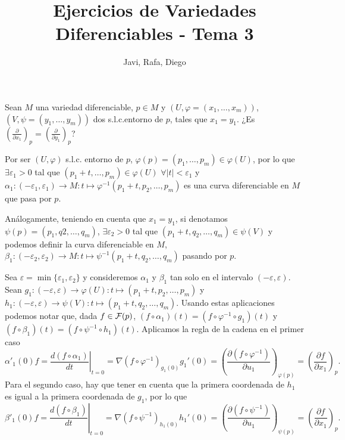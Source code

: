 \documentclass[twoside]{article}
\begin{document}
\title{Ejercicios de Variedades Diferenciables - Tema 3}
\author{Javi, Rafa, Diego}
\maketitle



\begin{ejercicio}{1}\label{1}
Sean $M$ una variedad diferenciable, $p \in M$ y $(U, \varphi = (x_1, \dots , x_m))$, $(V, \psi =
(y_1, \dots , y_m))$ dos s.l.c.entorno de $p$, tales que $x_1 = y_1$. ¿Es $\left(
\frac{\partial}{\partial x_1}\right)_p = \left(\frac{\partial}{\partial y_1}\right)_p$?
\end{ejercicio}
\begin{solucion}
Por ser $(U,\varphi)$ s.l.c. entorno de $p$, $\varphi(p)=(p_1,\dots,p_m)\in\varphi(U)$, por lo que $\exists \varepsilon_1>0$ tal que $(p_1+t,\dots,p_m)\in\varphi(U)$ $\forall |t|<\varepsilon_1$ y $\alpha_1:(-\varepsilon_1,\varepsilon_1)\to M: t\mapsto \varphi^{-1}(p_1+t,p_2,\dots,p_m)$ es una curva diferenciable en $M$ que pasa por $p$. 

Análogamente, teniendo en cuenta que $x_1=y_1$, si denotamos $\psi(p)=(p_1,q2,\dots,q_m)$, $\exists\varepsilon_2>0$ tal que $(p_1+t,q_2,\dots,q_m)\in\psi(V)$ y podemos definir la curva diferenciable en $M$, $\beta_1:(-\varepsilon_2,\varepsilon_2)\to M: t\mapsto\psi^{-1}(p_1+t,q_2,\dots,q_m)$ pasando por $p$. 

Sea $\varepsilon=\min\{\varepsilon_1,\varepsilon_2\}$ y consideremos $\alpha_1$ y $\beta
_1$ tan solo en el intervalo $(-\varepsilon,\varepsilon)$. Sean $g_1:(-\varepsilon,\varepsilon)\to\varphi(U):t\mapsto (p_1+t,p_2,\dots,p_m)$ y $h_1:(-\varepsilon,\varepsilon)\to\psi(V): t\mapsto(p_1+t,q_2,\dots,q_m)$. Usando estas aplicaciones podemos notar que, dada $f\in\mathcal{F}(p)$, $(f\circ\alpha_1)(t)=(f\circ\varphi^{-1}\circ g_1)(t)$ y $(f\circ\beta_1)(t)=(f\circ\psi^{-1}\circ h_1)(t)$. Aplicamos la regla de la cadena en el primer caso
$$
\alpha'_1(0)f=\left.\frac{d(f\circ\alpha_1)}{dt}\right|_{t=0}=\nabla(f\circ\varphi^{-1})_{g_1(0)}g_1'(0)=
\left(\frac{\partial (f\circ\varphi^{-1})}{\partial u_1}\right)_{\varphi(p)}=\left(\frac{\partial f}{\partial x_1}\right)_p.
$$
Para el segundo caso, hay que tener en cuenta que la primera coordenada de $h_1$ es igual a la primera coordenada de $g_1$, por lo que
$$
\beta'_1(0)f=\left.\frac{d(f\circ\beta_1)}{dt}\right|_{t=0}=\nabla(f\circ\psi^{-1})_{h_1(0)}h_1'(0)=
\left(\frac{\partial (f\circ\psi^{-1})}{\partial u_1}\right)_{\psi(p)}=\left(\frac{\partial f}{\partial x_1}\right)_p.
$$
\end{solucion}
\newpage
\end{document}
